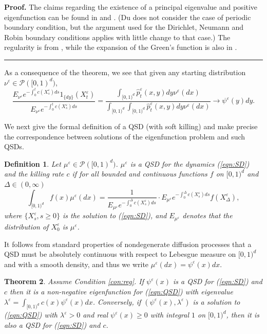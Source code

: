 \documentclass[english,11pt]{article}%
\newtheorem{theorem}{Theorem}
\newtheorem{definition}[theorem]{Definition}
\numberwithin{equation}{section}
\numberwithin{example}{section}
\numberwithin{theorem}{section}
\newenvironment{proof}[1][Proof]{\noindent\textbf{#1.} }{\ \rule{0.5em}{0.5em}}
\begin{document}
\begin{proof}
The claims regarding the existence of a principal eigenvalue and positive
eigenfunction can be found in \cite[Chapter 1]{du} and \cite[Chapter 3,
Theorem 10.1]{har7}. (Du does not consider the case of periodic boundary
condition, but the argument used for the Dirichlet, Neumann and Robin boundary
conditions applies with little change to that case.) The regularity is from
\cite[Chapter 2]{du}, while the expansion of the Green's function is also in
\cite[Chapter 3, Theorem 10.1]{har7}.
\end{proof}

\medskip As a consequence of the theorem, we see that given any starting
distribution $\nu^{\varepsilon}\in\mathcal{P}([0,1)^{d})$,
\[
\frac{E_{\nu^{\varepsilon}}e^{-\int_{0}^{t}c(X_{s}^{\varepsilon})ds}%
1_{\{dy\}}(X_{t}^{\varepsilon})}{E_{\nu^{\varepsilon}}e^{-\int_{0}^{t}%
c(X_{s}^{\varepsilon})ds}} =\frac{\int_{[0,1)^{d}}\hat{p}_{t}^{\varepsilon
}(x,y)dy\nu^{\varepsilon}(dx)}{{\int_{[0,1)^{d}}\int_{[0,1)^{d}}\hat{p}%
_{t}^{\varepsilon}(x,y)dy\nu^{\varepsilon}(dx)}} \rightarrow\psi^{\varepsilon
}(y)dy.
\]


\medskip We next give the formal definition of a QSD (with soft killing) and
make precise the correspondence between solutions of the eigenfunction problem
and such QSDs.

\begin{definition}
Let $\mu^{\varepsilon}\in\mathcal{P}([0,1)^{d})$. $\mu^{\varepsilon}$ is a QSD
for the dynamics (\ref{eqn:SD}) and the killing rate $c$ if for all bounded
and continuous functions $f$ on $[0,1)^{d}$ and $\Delta\in(0,\infty)$%
\[
\int_{\lbrack0,1)^{d}}f(x)\mu^{\varepsilon}(dx)=\frac{1}{E_{\mu^{\varepsilon}%
}e^{-\int_{0}^{\Delta}c(X_{s}^{\varepsilon})ds}}\cdot E_{\mu^{\varepsilon}%
}e^{-\int_{0}^{\Delta}c(X_{s}^{\varepsilon})ds}f(X_{\Delta}^{\varepsilon}),
\]
where $\{X_{s}^{\varepsilon},s\geq0\}$ is the solution to (\ref{eqn:SD}), and
$E_{\mu^{\varepsilon}}$ denotes that the distribution of $X_{0}^{\varepsilon}$
is $\mu^{\varepsilon}$.
\end{definition}

It follows from standard properties of nondegenerate diffusion processes that
a QSD must be absolutely continuous with respect to Lebesgue measure on
$[0,1)^{d}$ and with a smooth density, and thus we write $\mu^{\varepsilon
}(dx)=\psi^{\varepsilon}(x)dx$.

\begin{theorem}
\label{lem:qsd-ef} Assume Condition \ref{con:reg}. If $\psi^{\varepsilon}(x)$
is a QSD for (\ref{eqn:SD}) and $c$ then it is a non-negative eigenfunction
for (\ref{eqn:QSD}) with eigenvalue $\lambda^{\varepsilon}=\int_{[0,1)^{d}%
}c(x)\psi^{\varepsilon}(x)dx$. Conversely, if $(\psi^{\varepsilon}%
(x),\lambda^{\varepsilon})$ is a solution to (\ref{eqn:QSD}) with
$\lambda^{\varepsilon}>0$ and real $\psi^{\varepsilon}(x)\geq0$ with integral $1$
on $[0,1)^{d}$, then it is also a QSD for (\ref{eqn:SD}) and $c$.
\end{theorem}
\end{document}
